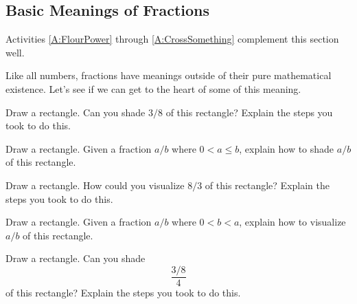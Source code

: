 \subsection{Basic Meanings of Fractions}
\begin{activitynote}
Activities \ref{A:FlourPower} through \ref{A:CrossSomething} complement this section well. 
\end{activitynote}
Like all numbers, fractions have meanings outside of their pure
mathematical existence. Let's see if we can get to the heart of some
of this meaning.
\begin{question}
Draw a rectangle. Can you shade $3/8$ of this rectangle? Explain the
steps you took to do this.
\end{question}
\QM


\begin{question}
Draw a rectangle. Given a fraction $a/b$ where $0< a\le b$, explain how
to shade $a/b$ of this rectangle.
\end{question}
\QM


\begin{question}
Draw a rectangle. How could you visualize $8/3$ of this rectangle?
Explain the steps you took to do this.
\end{question}
\QM


\begin{question}
Draw a rectangle. Given a fraction $a/b$ where $0< b< a$, explain how
to visualize $a/b$ of this rectangle.
\end{question}
\QM

\begin{question}
Draw a rectangle.  Can you shade
\[
\frac{3/8}{4}
\]
of this rectangle? Explain the steps you took to do this.
\end{question}
\QM



\newpage

